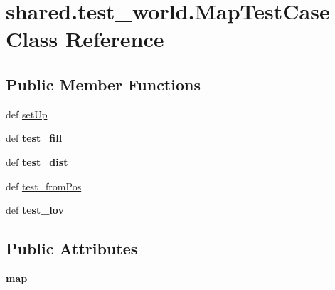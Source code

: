 \hypertarget{classshared_1_1test__world_1_1_map_test_case}{\section{shared.\-test\-\_\-world.\-Map\-Test\-Case \-Class \-Reference}
\label{classshared_1_1test__world_1_1_map_test_case}
}
\subsection*{\-Public \-Member \-Functions}
\begin{DoxyCompactItemize}
\item 
def \hyperlink{classshared_1_1test__world_1_1_map_test_case_a796155ca848518467438df28493a7c6c}{set\-Up}
\item 
\hypertarget{classshared_1_1test__world_1_1_map_test_case_a521af39d5b1ae1226d7a1c0920033b44}{def {\bfseries test\-\_\-fill}}\label{classshared_1_1test__world_1_1_map_test_case_a521af39d5b1ae1226d7a1c0920033b44}

\item 
\hypertarget{classshared_1_1test__world_1_1_map_test_case_adfb70c25df41859f139bf5b72c1c1039}{def {\bfseries test\-\_\-dist}}\label{classshared_1_1test__world_1_1_map_test_case_adfb70c25df41859f139bf5b72c1c1039}

\item 
def \hyperlink{classshared_1_1test__world_1_1_map_test_case_ae75af77d9af27d09d73d23a481ecafc0}{test\-\_\-from\-Pos}
\item 
\hypertarget{classshared_1_1test__world_1_1_map_test_case_afbc4f2fac5c230f9e5ade84019afe706}{def {\bfseries test\-\_\-lov}}\label{classshared_1_1test__world_1_1_map_test_case_afbc4f2fac5c230f9e5ade84019afe706}

\end{DoxyCompactItemize}
\subsection*{\-Public \-Attributes}
\begin{DoxyCompactItemize}
\item 
\hypertarget{classshared_1_1test__world_1_1_map_test_case_a26f41524902aae70daa79a81e2289bab}{{\bfseries map}}\label{classshared_1_1test__world_1_1_map_test_case_a26f41524902aae70daa79a81e2289bab}

\end{DoxyCompactItemize}


